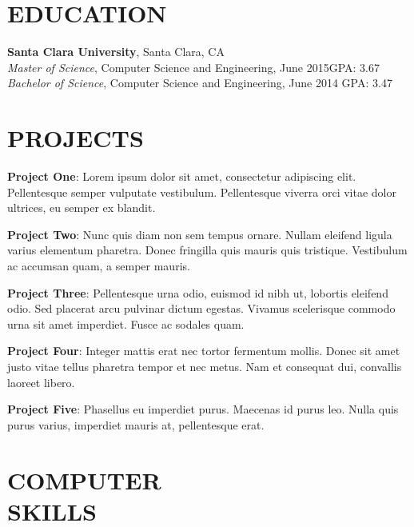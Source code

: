 \documentclass[margin]{res}
\begin{document}
\begin{resume}

\section{EDUCATION}
  \textbf{Santa Clara University}, Santa Clara, CA\\
  {\sl Master of Science}, Computer Science and Engineering, June 2015\hfill GPA: 3.67\\
  {\sl Bachelor of Science}, Computer Science and Engineering, June 2014\hfill 
  GPA: 3.47

\section{PROJECTS}
  \par
  \textbf{Project One}: 
  Lorem ipsum dolor sit amet, consectetur adipiscing elit. Pellentesque semper 
  vulputate vestibulum. Pellentesque viverra orci vitae dolor ultrices, eu semper 
  ex blandit. 

  \par
  \textbf{Project Two}:
  Nunc quis diam non sem tempus ornare. Nullam eleifend ligula varius 
  elementum pharetra. Donec fringilla quis mauris quis tristique. Vestibulum ac 
  accumsan quam, a semper mauris. 
  \par
  \textbf{Project Three}: 
  Pellentesque urna odio, euismod id nibh ut,  lobortis eleifend odio. Sed 
  placerat arcu pulvinar dictum egestas. Vivamus  scelerisque commodo urna sit 
  amet imperdiet. Fusce ac sodales quam.

  \par
  \textbf{Project Four}: 
  Integer mattis erat nec tortor fermentum mollis. Donec sit amet justo vitae 
  tellus pharetra tempor et nec metus. Nam et consequat dui, convallis laoreet 
  libero. 

  \par
  \textbf{Project Five}: 
  Phasellus eu imperdiet purus. Maecenas id purus leo. Nulla quis purus varius, 
  imperdiet mauris at, pellentesque erat. 


\section{COMPUTER\\SKILLS}


\end{resume}
\end{document}
